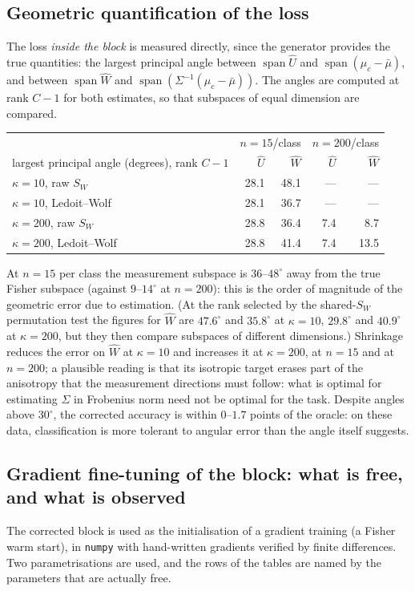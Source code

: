 \documentclass[11pt,a4paper]{article}
\theoremstyle{plain}
\theoremstyle{definition}
\theoremstyle{remark}
\newcommand{\spn}{\operatorname{span}}
\begin{document}
\subsection{Geometric quantification of the loss}
The loss \emph{inside the block} is measured directly, since the generator
provides the true quantities: the largest principal angle between $\spn\hat U$
and $\spn(\mu_c-\bar\mu)$, and between $\spn\hat W$ and
$\spn(\Sigma^{-1}(\mu_c-\bar\mu))$.
The angles are computed at rank $C-1$ for both estimates, so that subspaces
of equal dimension are compared.
\begin{center}
\small
\begin{tabular}{@{}lrrrr@{}}
\toprule
 & \multicolumn{2}{c}{$n=15$/class} & \multicolumn{2}{c}{$n=200$/class} \\
largest principal angle (degrees), rank $C-1$ & $\hat U$ & $\hat W$ & $\hat U$ & $\hat W$ \\
\midrule
$\kappa=10$, raw $S_W$ & 28.1 & 48.1 & --- & --- \\
$\kappa=10$, Ledoit--Wolf & 28.1 & 36.7 & --- & --- \\
$\kappa=200$, raw $S_W$ & 28.8 & 36.4 & 7.4 & 8.7 \\
$\kappa=200$, Ledoit--Wolf & 28.8 & 41.4 & 7.4 & 13.5 \\
\bottomrule
\end{tabular}
\end{center}
At $n=15$ per class the measurement subspace is $36$--$48^\circ$ away from
the true Fisher subspace (against $9$--$14^\circ$ at $n=200$): this is the
order of magnitude of the geometric error due to estimation. (At the rank
selected by the shared-$S_W$ permutation test the figures for $\hat W$ are
$47.6^\circ$ and $35.8^\circ$ at $\kappa=10$, $29.8^\circ$ and $40.9^\circ$ at
$\kappa=200$, but they then compare subspaces of different dimensions.)
Shrinkage reduces the error on $\hat W$ at $\kappa=10$ and increases it at
$\kappa=200$, at $n=15$ and at $n=200$; a plausible reading is that its
isotropic target erases part of the anisotropy that the measurement
directions must follow: what is optimal for estimating $\Sigma$ in Frobenius
norm need not be optimal for the task. Despite angles above $30^\circ$, the
corrected accuracy is within $0$--$1.7$ points of the oracle: on these data,
classification is more tolerant to angular error than the angle itself
suggests.

\subsection{Gradient fine-tuning of the block: what is free, and what is observed}
\label{sec:reinjection}
The corrected block is used as the initialisation of a gradient training
(a Fisher warm start), in \texttt{numpy} with hand-written gradients
verified by finite differences. Two parametrisations are used, and the rows
of the tables are named by the parameters that are actually free.
\end{document}

